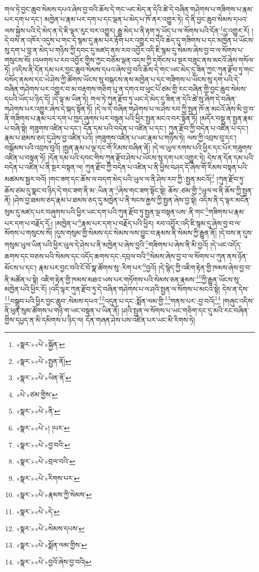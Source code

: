 གལ་ཏེ་བྱང་ཆུབ་སེམས་དཔའ་ཞེས་བྱ་བའི་ཆོས་དེ་གང་ཡང་མེད་ན་དེའི་ཚེ་དེ་བཞིན་གཤེགས་པ་གཟིགས་པ་རྣམ་པར་དག་པ་དང་། མཁྱེན་པ་རྣམ་པར་དག་པ་དང་ལྡན་པ་མེད་པ་ཁོ་ནར་འགྱུར་ཏེ། དེ་ནི་བྱང་ཆུབ་སེམས་དཔའ་ལས་སྐྱེས་པའི་དེ་མེད་ན་དེ་ཇི་ལྟར་རུང་བར་འགྱུར། རྒྱུ་མེད་པ་ནི་རྟག་ཏུ་ཡོད་པ་ལ་སོགས་པའི་དོན་\footnote{«སྣར་»«པེ་»སྐྱོན་}དུ་འགྱུར་རོ། །དེ་བས་ན་འཁོར་འདུས་པ་གང་དེ་སྙམ་དུ་རྣམ་པར་རྟོག་པར་འགྱུར་བ་དེའི་ཆེད་དུ་གཟིགས་པ་དང་མཁྱེན་པ་ཡོངས་སུ་དག་པ་བླ་ན་མེད་པ་གཉིས་ཀྱི་དབང་དུ་མཛད་ནས་རབ་འབྱོར་འདི་ཇི་སྙམ་དུ་སེམས་ཞེས་བྱ་བ་ལ་སོགས་པ་གསུངས་སོ། །འཕགས་པ་རབ་འབྱོར་གྱིས་ཀྱང་བཅོམ་ལྡན་འདས་ཀྱི་དགོངས་པ་སྔར་བཟུང་ནས་མངའོ་ཞེས་གསོལ་ཏོ། །འདིས་ནི་དོན་དམ་པར་བྱང་ཆུབ་སེམས་དཔའ་ཞེས་བྱ་བའི་ཆོས་དེ་གང་ཡང་མེད་དུ་ཟིན་ཀྱང་ཀུན་རྫོབ་ཏུ་གང་བསོད་ནམས་དང་ཡེ་ཤེས་ཀྱི་ཚོགས་ཡོངས་སུ་བསྐངས་ནས་མཁྱེན་པ་དང་གཟིགས་པ་ཡོངས་སུ་དག་པའི་དེ་བཞིན་གཤེགས་པར་འགྱུར་བ་མ་བརྟགས་གཅིག་པུ་ན་དགའ་བ་ཕུང་པོ་ཙམ་གྱི་རང་བཞིན་གྱི་བྱང་ཆུབ་སེམས་དཔའི་ཡོད་པ་ཉིད་དོ། །དེ་ལྟ་མ་ཡིན་ཏེ། གལ་ཏེ་ཀུན་རྫོབ་ཏུ་ཡང་དེ་མེད་དུ་ཟིན་ན་དེའི་ཚེ་སུ་ཞིག་དེ་བཞིན་གཤེགས་པར་འགྱུར་ཞེས་དེ་སྐད་སྟོན་ཏོ། །དེ་ལ་དེ་བཞིན་གཤེགས་པ་ལ་ཤེས་རབ་ཀྱི་སྤྱན་ཁོ་ན་མངའོ་ཞེས་མི་བྱ་བ་ནི་གཟིགས་པ་རྣམ་པར་དག་པ་ཁྱད་ཞུགས་པར་བསྟན་པའི་ཕྱིར་སྤྱན་མངའ་བར་སྟོན་ཏོ། །མདོར་བསྡུ་ན་སྤྱན་རྣམ་པ་བཞི་སྟེ། གཟུགས་འཛིན་པ་དང་། དོན་དམ་པའི་བདེན་པ་འཛིན་པ་དང་། ཀུན་རྫོབ་ཀྱི་བདེན་པ་འཛིན་པ་དང་། རྣམ་པ་ཐམས་ཅད་དུ་ཤེས་བྱ་འཛིན་པའོ། །གཟུགས་འཛིན་པ་ཡང་རྣམ་པ་གཉིས་ཏེ། ལས་ཀྱི་འབྲས་བུ་དང་། བསྒོམས་པའི་འབྲས་བུའོ། །སྤྱན་རྣམ་པ་ལྔ་དང་གོ་རིམས་བཞིན་ནོ། །དེ་ལ་ཡུལ་རགས་པའི་ཕྱིར་དང་པོར་གཟུགས་འཛིན་པ་བསྟན་ཏོ། །དོན་དམ་པའི་དབང་གིས་ཀུན་རྫོབ་ཤེས་པ་ཡོངས་སུ་དག་པར་འགྱུར་ཏེ། དེས་ན་དོན་དམ་པའི་བདེན་པ་འཛིན་པ་ནི་སྔར་བསྟན་ལ། ཀུན་རྫོབ་ཀྱི་བདེན་པ་འཛིན་པ་ནི་ཕྱིས་བཤད་དོ་ཞེས་གོ་རིམས་བསྟན་པའི་མཚམས་སྦྱར་བའོ། །གང་ཟག་དང་ཆོས་ལ་བདག་མེད་པའི་ཡུལ་ལ་ནི་ཤེས་རབ་ཀྱི་:སྤྱན་མངའོ།\footnote{«སྣར་»«པེ་»སྤྱན་ནོ།} །ཀུན་རྫོབ་ཏུ་ཆོས་ཙམ་དུ་སྣང་བ་ཉིད་དེ་གང་ཟག་ནི་མ་:ཡིན་ན་\footnote{«སྣར་»«པེ་»ཡིན་ནོ་}ཞེས་གང་ཟག་སྟོང་སྟེ། ཆོས་:ཙམ་གྱི་\footnote{«པེ་»ཙམ་གྱིས་}ཡུལ་ལ་ནི་ཆོས་ཀྱི་སྤྱན་ནོ། །ཤེས་བྱ་ཐམས་ཅད་རྣམ་པ་ཐམས་ཅད་དུ་མཁྱེན་པ་ནི་སངས་རྒྱས་ཀྱི་སྤྱན་ཞེས་བྱ་སྟེ། འདིས་ནི་ད་ལྟར་མངོན་སུམ་དུ་མཛད་པར་བཞུགས་པའི་ཕྱིར་ཡང་དག་པའི་ཀུན་རྫོབ་ཏུ་སྤྱན་ལྔ་བསྟན་པས་:ནི་གང་\footnote{«སྣར་»«པེ་»ནི་}གཟིགས་པ་རྣམ་པར་དག་པ་བརྗོད་དོ:། །མཁྱེན་པ་\footnote{«སྣར་»«པེ་»། །པར་}རྣམ་པར་དག་པ་བརྗོད་པའི་ཕྱིར། རབ་འབྱོར་འདི་ཇི་སྙམ་དུ་ཞེས་བྱ་བ་ལ་སོགས་པ་གསུངས་སོ། །དུས་གསུམ་གྱི་སེམས་དང་སེམས་ལས་བྱུང་བ་རྣམས་ནི་སེམས་ཀྱི་རྒྱུན་ནོ། །དེ་བས་ན་དུས་གསུམ་ཡུལ་ཡིན་པའི་ཕྱིར་ཡུལ་དེ་ཤེས་པ་ནི་མཁྱེན་པ་ཞེས་བྱའི་\footnote{«སྣར་»«པེ་»བྱ་བའི་}གཟིགས་པ་ཞེས་ནི་མི་བྱའོ། །དེ་ཡང་འདོད་ཆགས་དང་བཅས་པའི་སེམས་དང་འདོད་ཆགས་དང་:དབྲལ་བའི་\footnote{«སྣར་»«པེ་»བྲལ་བའི་}སེམས་ཞེས་བྱ་བ་ལ་སོགས་པ་ཀུན་ནས་ཉོན་མོངས་པ་དང་། རྣམ་པར་བྱང་བའི་ངོ་བོ་སྣ་ཚོགས་སུ་:རིག་པར་\footnote{«སྣར་»«པེ་»རིགས་པར་}བྱའོ། །དེ་སྙེད་ཀྱི་འཇིག་རྟེན་གྱི་ཁམས་ཞེས་བྱ་བ་ནི་མཚོན་པ་སྟེ། འཇིག་རྟེན་གྱི་ཁམས་མཐའ་ཡས་པར་གཏོགས་པའི་སེམས་ཅན་རྣམས་\footnote{«སྣར་»«པེ་»རྣམས་ཀྱི་སེམས་}ཀྱི་རྒྱུན་ཡོངས་སུ་མཁྱེན་པའི་ཕྱིར་རོ། །འདི་ལྟར་ཀུན་རྫོབ་ཏུ་དེ་བཞིན་གཤེགས་པ་ལ་ཤའི་སྤྱན་ལ་སོགས་པ་མངའ་སྟེ། དེས་ན་དེས་\footnote{«སྣར་»«པེ་»དེ་}བསྒྲུབ་པའི་ཕྱིར་བྱང་ཆུབ་:སེམས་དཔའ་\footnote{«སྣར་»«པེ་»སེམས་དཔས་}འདུན་པ་དང་:སྨོན་ལམ་གྱི་\footnote{«སྣར་»«པེ་»སྨོན་ལམ་གྱིས་}གནས་པར་:བྱ་བའོ།\footnote{«སྣར་»«པེ་»བྱའོ་ཞེས་བྱ་བའི།} །གཞུང་འདིས་ནི་ཕུན་སུམ་ཚོགས་པ་གཉི་ག་ཡང་བསྟན་པ་ཡིན་ནོ། །ཤའི་སྤྱན་ལ་སོགས་པ་ཡང་གཅིག་དང་དུ་མའི་རང་བཞིན་གྱིས་དཔྱད་ན་མི་དམིགས་པ་ཉིད་ལ། དོན་གཞན་ཤེས་པས་འཛིན་པར་ཡང་མི་རིགས་ཏེ། 